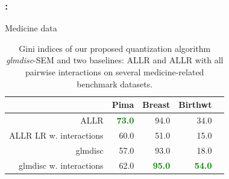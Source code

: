 \documentclass[english,xcolor={rgb,dvipsnames,table,usenames}]{beamer}
\begin{document}
\begin{frame}
\frametitle{\secname : \subsecname}

Medicine data

\begin{table}[t]
\begin{center}
\caption{Gini indices of our proposed quantization algorithm \textit{glmdisc}-SEM and two baselines: ALLR and ALLR with all pairwise interactions on several medicine-related benchmark datasets.}
\label{tab:banchmark_medicine}
\begin{adjustbox}{max width=0.99\textwidth}
\begin{tabular}{rrrrr}
 & Pima & Breast & Birthwt \\ 
  \hline
ALLR & {\textcolor{green}{\textbf{73.0}}} & 94.0 & 34.0 \\ 
ALLR LR w. interactions & 60.0 & 51.0 & 15.0 \\ 
glmdisc & 57.0 & 93.0 & 18.0 \\ 
glmdisc w. interactions & 62.0 & \textcolor{green}{\textbf{95.0}} & \textcolor{green}{{\textbf{54.0}}}\\ 
\end{tabular}
\end{adjustbox}
\end{center}
\end{table}


\end{frame}
\end{document}
